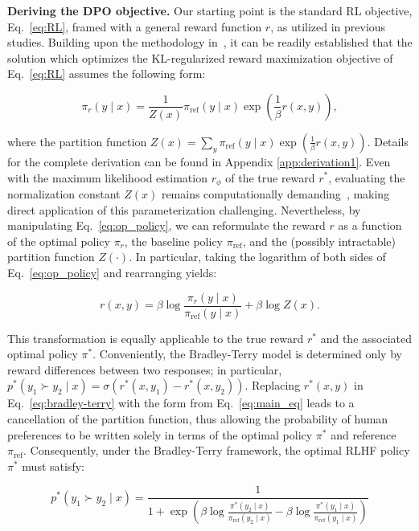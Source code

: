 \textbf{Deriving the DPO objective.} Our starting point is the standard RL objective, Eq.~\ref{eq:RL}, framed with a general reward function $r$, as utilized in previous studies. Building upon the methodology in~\citep{peters2007reinforcement, peng2019advantage, korbak2022reinforcement, go2023aligning}, it can be readily established that the solution which optimizes the KL-regularized reward maximization objective of Eq.~\ref{eq:RL} assumes the following form:

\begin{equation}\label{eq:op_policy}
    \pi_r(y\mid x) = \frac{1}{Z(x)}\pi_\text{ref}(y\mid x)\exp\left(\frac{1}{\beta}r(x, y)\right),
\end{equation}

where the partition function $Z(x) =\sum_{y}\pi_\text{ref}(y\mid x)\exp\left(\frac{1}{\beta}r(x, y)\right)$. Details for the complete derivation can be found in Appendix \ref{app:derivation1}. Even with the maximum likelihood estimation $r_{\phi}$ of the true reward $r^*$, evaluating the normalization constant $Z(x)$ remains computationally demanding~\citep{korbak2022reinforcement, go2023aligning}, making direct application of this parameterization challenging. Nevertheless, by manipulating Eq.~\ref{eq:op_policy}, we can reformulate the reward $r$ as a function of the optimal policy $\pi_r$, the baseline policy $\pi_\text{ref}$, and the (possibly intractable) partition function $Z(\cdot)$. In particular, taking the logarithm of both sides of Eq.~\ref{eq:op_policy} and rearranging yields:

\begin{equation}\label{eq:main_eq}
    r(x,y) =\beta \log \frac{\pi_r(y\mid x)}{\pi_\text{ref}(y\mid x)} + \beta \log Z(x).
\end{equation}

This transformation is equally applicable to the true reward $r^*$ and the associated optimal policy $\pi^*$. Conveniently, the Bradley-Terry model is determined only by reward differences between two responses; in particular, ${p^*(y_1 \succ y_2 \mid x) = \sigma(r^*(x, y_1) - r^*(x, y_2))}$. Replacing $r^*(x, y)$ in Eq.~\ref{eq:bradley-terry} with the form from Eq.~\ref{eq:main_eq} leads to a cancellation of the partition function, thus allowing the probability of human preferences to be written solely in terms of the optimal policy $\pi^*$ and reference $\pi_\text{ref}$. Consequently, under the Bradley-Terry framework, the optimal RLHF policy $\pi^*$ must satisfy:

\begin{equation}\label{eq:objective}
    p^*(y_1\succ y_2 \mid x)=\frac{1}{1 + \exp\left(\beta \log \frac{\pi^*(y_2\mid x)}{\pi_\text{ref}(y_2\mid x)} - \beta \log \frac{\pi^*(y_1\mid x)}{\pi_\text{ref}(y_1\mid x)}\right)}
\end{equation}

